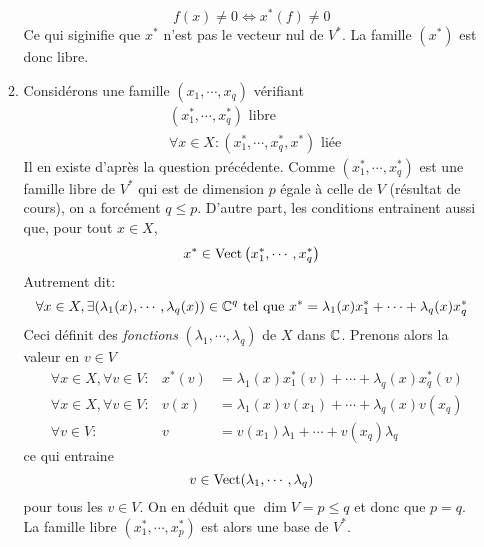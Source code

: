 \begin{enumerate}
\begin{enumerate}
\begin{displaymath}
f(x)\neq 0 \Leftrightarrow x^*(f)\neq 0 
\end{displaymath}
Ce qui siginifie que $x^*$ n'est pas le vecteur nul de $V^*$. La famille $(x^*)$ est donc libre.
\item Considérons une famille $(x_1,\cdots, x_q)$ vérifiant
\begin{align*}
 &(x^*_1,\cdots, x^*_q) \text{ libre }\\
 &\forall x\in X : (x^*_1,\cdots, x^*_q,x^*) \text{ liée }
\end{align*}
Il en existe d'après la question précédente.\newline
Comme $(x^*_1,\cdots, x^*_q)$ est une famille libre de $V^*$ qui est de dimension $p$ égale à celle de $V$ (résultat de cours), on a forcément $q\leq p$.\newline
D'autre part, les conditions entrainent aussi que, pour tout $x\in X$,
\begin{displaymath}
 x^* \in \operatorname{Vect}\left( x^*_1,\cdots, x^*_q\right) 
\end{displaymath}
Autrement dit:
\begin{displaymath}
 \forall x\in X, \exists (\lambda_1(x),\cdots,\lambda_q(x))\in\mathbb{C}^q \text{ tel que }
x^* = \lambda_1(x)x_1^* + \cdots + \lambda_q(x)x_q^*
\end{displaymath}
Ceci définit des \emph{fonctions} $(\lambda_1,\cdots,\lambda_q)$ de $X$ dans $\mathbb{C}$.\newline
Prenons alors la valeur en $v\in V$
\begin{align*}
 &\forall x\in X,\forall v\in V : &x^*(v) &= \lambda_1(x)x_1^*(v) + \cdots + \lambda_q(x)x_q^*(v)\\
&\forall x\in X,\forall v\in V : &v(x) &= \lambda_1(x)v(x_1) + \cdots + \lambda_q(x)v(x_q)\\
&\forall v\in V : &v &= v(x_1)\lambda_1 + \cdots + v(x_q)\lambda_q
\end{align*}
ce qui entraine
\begin{displaymath}
 v\in \operatorname{Vect} (\lambda_1, \cdots , \lambda_q) 
\end{displaymath}
pour tous les $v\in V$. On en déduit que $\dim V =p \leq q$ et donc que $p=q$. La famille libre $(x^*_1,\cdots, x^*_p)$ est alors une base de $V^*$.
\end{enumerate}
\end{enumerate}